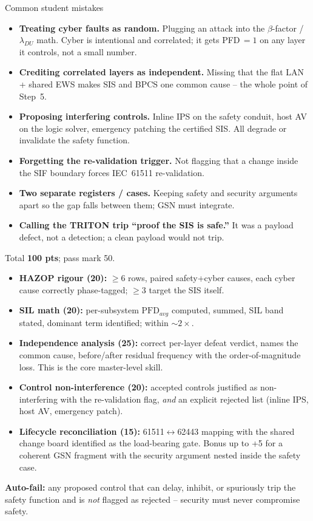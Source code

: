 \documentclass[11pt,a4paper]{article}
\begin{document}
\begin{solutionbox}{Common student mistakes}
\begin{itemize}[leftmargin=*, nosep]
  \item \textbf{Treating cyber faults as random.} Plugging an attack into the
        $\beta$-factor / $\lambda_{DU}$ math. Cyber is intentional and
        correlated; it gets PFD\,$=1$ on any layer it controls, not a small
        number.
  \item \textbf{Crediting correlated layers as independent.} Missing that the
        flat LAN + shared EWS makes SIS and BPCS one common cause -- the whole
        point of Step~5.
  \item \textbf{Proposing interfering controls.} Inline IPS on the safety
        conduit, host AV on the logic solver, emergency patching the certified
        SIS. All degrade or invalidate the safety function.
  \item \textbf{Forgetting the re-validation trigger.} Not flagging that a
        change inside the SIF boundary forces IEC~61511 re-validation.
  \item \textbf{Two separate registers / cases.} Keeping safety and security
        arguments apart so the gap falls between them; GSN must integrate.
  \item \textbf{Calling the TRITON trip ``proof the SIS is safe.''} It was a
        payload defect, not a detection; a clean payload would not trip.
\end{itemize}
\end{solutionbox}

\begin{rubricbox}
Total \textbf{100 pts}; pass mark 50.
\begin{itemize}[leftmargin=*, nosep]
  \item \textbf{HAZOP rigour (20):} $\geq6$ rows, paired safety+cyber causes,
        each cyber cause correctly phase-tagged; $\geq3$ target the SIS itself.
  \item \textbf{SIL math (20):} per-subsystem $\mathrm{PFD}_{avg}$ computed,
        summed, SIL band stated, dominant term identified; within $\sim2\times$.
  \item \textbf{Independence analysis (25):} correct per-layer defeat verdict,
        names the common cause, before/after residual frequency with the
        order-of-magnitude loss. This is the core master-level skill.
  \item \textbf{Control non-interference (20):} accepted controls justified as
        non-interfering with the re-validation flag, \emph{and} an explicit
        rejected list (inline IPS, host AV, emergency patch).
  \item \textbf{Lifecycle reconciliation (15):} 61511$\leftrightarrow$62443
        mapping with the shared change board identified as the load-bearing
        gate. Bonus up to +5 for a coherent GSN fragment with the security
        argument nested inside the safety case.
\end{itemize}
\textbf{Auto-fail:} any proposed control that can delay, inhibit, or
spuriously trip the safety function and is \emph{not} flagged as rejected --
security must never compromise safety.
\end{rubricbox}
\end{document}
